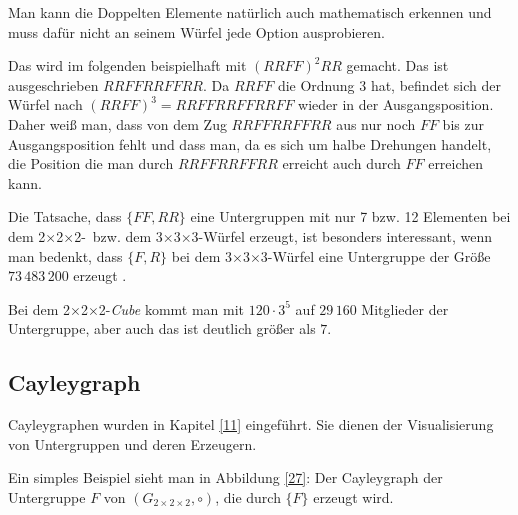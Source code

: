 \documentclass[12pt,a4paper, usenames, dvipsnames]{article}
\newcommand{\Gtwo}{\ensuremath{G_{2\times 2\times 2}}}
\newcommand{\Ttwo}{2$\times$2$\times$2-}
\newcommand{\Tthree}{3$\times$3$\times$3-}
\begin{document}
Man kann die Doppelten Elemente natürlich auch mathematisch erkennen und muss dafür nicht an seinem Würfel jede Option ausprobieren.

Das wird im folgenden beispielhaft mit $(RRFF)^2RR$ gemacht. Das ist ausgeschrieben $RRFFRRFFRR$. Da $RRFF$ die Ordnung 3 hat, befindet sich der Würfel nach $(RRFF)^3 = RRFFRRFFRRFF$ wieder in der Ausgangsposition. Daher weiß man, dass von dem Zug $RRFFRRFFRR$ aus nur noch $FF$ bis zur Ausgangsposition fehlt und dass man, da es sich um halbe Drehungen handelt, die Position die man durch $RRFFRRFFRR$ erreicht auch durch $FF$ erreichen kann.

Die Tatsache, dass $\{ FF, RR \}$ eine Untergruppen mit nur 7 bzw. 12 Elementen bei dem \Ttwo \  bzw. dem \Tthree Würfel erzeugt, ist besonders interessant, wenn man bedenkt, dass $\{ F, R \}$ bei dem  \Tthree Würfel eine Untergruppe der Größe $73\, 483\, 200$ erzeugt \cite{TD}. 

Bei dem \Ttwo \textit{Cube} kommt man mit $120 \cdot 3^5$ auf $29 \, 160$ Mitglieder der Untergruppe, aber auch das ist deutlich größer als $7$.

%
%
%
%
%
%
%
%
%
%
%
%
%
%
%
%
\subsection*{Cayleygraph}
Cayleygraphen wurden in Kapitel \ref{11} eingeführt. Sie dienen der Visualisierung von Untergruppen und deren Erzeugern.

Ein simples Beispiel sieht man in Abbildung \ref{27}: Der Cayleygraph der Untergruppe $F$ von $(\Gtwo, \circ)$, die durch $\{ F \}$  erzeugt wird.
\end{document}
